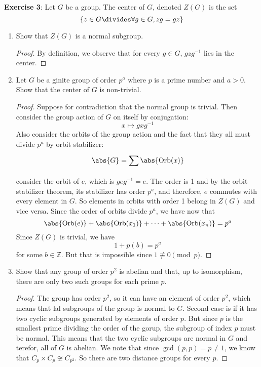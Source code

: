 \documentclass{article}
\begin{document}
\textbf{Exercise 3}: Let $G$ be a group. The center of $G$, denoted $Z(G)$ is the set
\begin{equation*}
	\{z \in G \divides \forall g \in G, zg = gz\}
\end{equation*}
\begin{enumerate}
	\item Show that $Z(G)$ is a normal subgroup.
		\begin{proof}
			By definition, we observe that for every  $g \in G$, $gzg^{-1}$ lies in the center.
		\end{proof}

	\item Let $G$ be a ginite group of order $p^{a}$ where $p$ is a prime number and $a > 0$. Show that the center of $G$ is non-trivial.
		\begin{proof}
			Suppose for contradiction that the normal group is trivial. Then consider the group action of $G$ on itself by conjugation:
			\begin{equation*}
				x \mapsto gxg^{-1}
			\end{equation*}
			Also consider the orbits of the group action and the fact that they all must divide $p^{a}$ by orbit stabilizer:
			\begin{equation*}
				\abs{G} = \sum_{}^{}\abs{\text{Orb}(x)}
			\end{equation*}
			consider the orbit of $e$, which is $geg^{-1} = e$. The order is 1 and by the orbit stabilizer theorem, its stabilizer has order $p^{a}$, and therefore, $e$ commutes with every element in $G$. So elements in orbits with order 1 belong in $Z(G)$ and vice versa. Since the order of orbits divide $p^{a}$,  we have now that
			\begin{equation*}
				\abs{\text{Orb}(e)} + \abs{\text{Orb}(x_{1})} + \cdots + \abs{\text{Orb}(x_{n})} = p^{a}
			\end{equation*}
			Since $Z(G)$ is trivial, we have 
			\begin{equation*}
				1 + p(b) = p^{a}
			\end{equation*}
			for some $b \in \mathbb{Z}$. But that is impossible since $1 \not\equiv 0\pmod{p}$.
		\end{proof}

	\item Show that any group of order $p^{2}$ is abelian and that, up to isomorphism, there are only two such groups for each prime $p$.
		\begin{proof}
			The group has order $p^{2}$, so it can have an element of order $p^{2}$, which means that lal subgroups of the group is normal to $G$. Second case is if it has two cyclic subgroups generated by elements of order $p$. But since $p$ is the smallest prime dividing the order of the gorup, the subgroup of index $p$ must be normal. This means that the two cyclic subgroups are normal in $G$ and terefor, all of $G$ is abelian. We note that since $\gcd{(p,p)} = p \neq 1$, we know that $C_{p} \times C_{p} \not\cong C_{p^{2}}$. So there are two distance groups for every $p$.
		\end{proof}
\end{enumerate}
\end{document}
